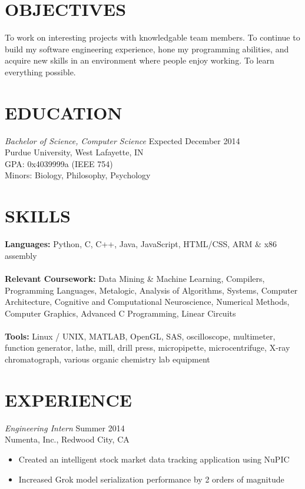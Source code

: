 \documentclass[margin,5pt]{res} %
\begin{document}
\address{me@vsinha.com\\ vsinha.com \\github.com/vsinha}
\address{217 Pierce St. Unit 2 \\ West Lafayette, IN 47906\\(408) 505-1275}


\begin{resume}

 
\section{OBJECTIVES}To work on interesting projects with knowledgable team members. To continue to build
my software engineering experience, hone my programming abilities, and acquire new skills
in an environment where people enjoy working. To learn everything possible.

 

\section{EDUCATION} {\sl Bachelor of Science, Computer Science }\hfill Expected December 2014\\
               	 	    Purdue University, West Lafayette, IN\\
			    GPA: 0x4039999a (IEEE 754) \\
                            Minors: Biology, Philosophy,  Psychology 
 

\section{SKILLS} {\bf Languages:} Python, C, C++, Java, JavaScript, HTML/CSS, ARM \& x86 assembly\\ \\
 		      {\bf Relevant Coursework:} Data Mining \& Machine Learning, Compilers, Programming Languages, Metalogic, Analysis of Algorithms, 
							Systems, Computer Architecture, Cognitive and Computational Neuroscience,
							Numerical Methods, Computer Graphics, Advanced C Programming, Linear Circuits\\ \\
		      {\bf Tools:} Linux / UNIX, MATLAB, OpenGL, SAS, oscilloscope, multimeter, function generator, lathe, mill, drill press, 
					micropipette, microcentrifuge, X-ray chromatograph, various organic chemistry lab equipment
 

\section{EXPERIENCE} {\sl Engineering Intern} \hfill Summer 2014\\
               Numenta, Inc., Redwood City, CA
                \begin{itemize} \itemsep -2pt
                \item Created an intelligent stock market data tracking application using NuPIC
                \item Increased Grok model serialization performance by 2 orders of magnitude
	       \end{itemize}



\end{resume}
\end{document}
